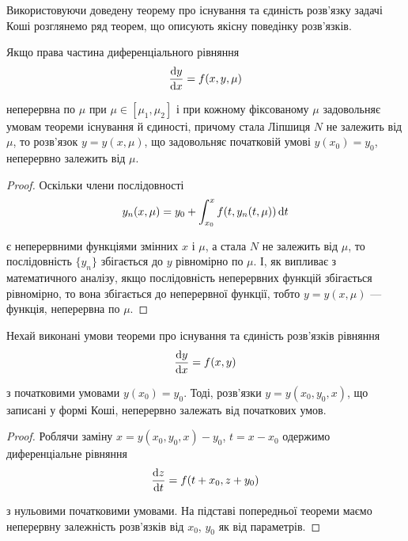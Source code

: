 Використовуючи доведену теорему про існування та єдиність роз\-в'яз\-ку задачі Коші розглянемо ряд теорем, що описують якісну поведінку роз\-в'яз\-ків.

\begin{theorem}
	Якщо права частина диференціального рівняння
	\begin{equation*}
		\frac{\mathop{}\!\mathrm{d} y}{\mathop{}\!\mathrm{d} x} = f(x, y, \mu)
	\end{equation*}

	неперервна по $\mu$ при $\mu \in [\mu_1, \mu_2]$ і при кожному фіксованому $\mu$ задовольняє умовам теореми існування й єдиності, причому стала Ліпшиця $N$ не залежить від $\mu$, то розв'язок $y = y(x, \mu)$, що задовольняє початковій умові $y(x_0)=y_0$, неперервно залежить від $\mu$.
\end{theorem}

\begin{proof} 
	Оскільки члени послідовності
	\begin{equation*}
		y_n(x, \mu) = y_0 + \int_{x_0}^x f(t, y_n(t, \mu)) \mathop{}\!\mathrm{d} t
	\end{equation*}

	є неперервними функціями змінних $x$ і $\mu$, а стала $N$ не залежить від $\mu$, то послідовність $\{y_n\}$ збігається до $y$ рівномірно по $\mu$. І, як випливає з математичного аналізу, якщо послідовність неперервних функцій збігається рівномірно, то вона збігається до неперервної функції, тобто $y=y(x,\mu)$ --- функція, неперервна по $\mu$.
\end{proof}

\begin{theorem}
	Нехай виконані умови теореми про існування та єдиність роз\-в'я\-зків рівняння
	\begin{equation*}
		\frac{\mathop{}\!\mathrm{d} y}{\mathop{}\!\mathrm{d} x} = f(x,y)
	\end{equation*}

	з початковими умовами $y(x_0) = y_0$. Тоді, розв'язки $y=y(x_0,y_0,x)$, що записані у формі Коші, неперервно залежать від початкових умов. 
\end{theorem}

\begin{proof}
	Роблячи заміну $x = y(x_0, y_0, x) - y_0$, $t = x - x_0$ одержимо диференціальне рівняння 
	\begin{equation*}
		\frac{\mathop{}\!\mathrm{d} z}{\mathop{}\!\mathrm{d} t} = f(t + x_0, z + y_0)
	\end{equation*}

	з нульовими початковими умовами. На підставі попередньої теореми маємо неперервну залежність розв'язків від $x_0$, $y_0$ як від параметрів.
\end{proof}

